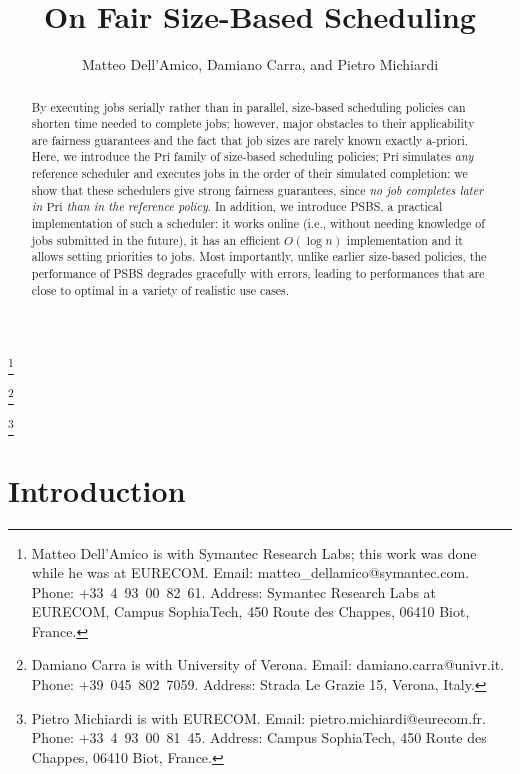 \documentclass[11pt,oneside,english]{amsart}
\numberwithin{equation}{section}
\numberwithin{figure}{section}
\theoremstyle{definition}
\theoremstyle{plain}
\begin{document}
\title{On Fair Size-Based Scheduling}


\author{Matteo Dell'Amico, Damiano Carra, and Pietro Michiardi}

\begin{abstract}
By executing jobs serially rather than in parallel, size-based
scheduling policies can shorten time needed to complete jobs; however,
major obstacles to their applicability are fairness guarantees and the
fact that job sizes are rarely known exactly a-priori. Here, we
introduce the $\mathrm{Pri}$ family of size-based scheduling policies;
$\mathrm{Pri}$ simulates \emph{any} reference scheduler and executes
jobs in the order of their simulated completion: we show that these
schedulers give strong fairness guarantees, since \emph{no job
  completes later in $\mathrm{Pri}$ than in the reference policy}. In
addition, we introduce PSBS, a practical implementation of such a
scheduler: it works online (i.e., without needing knowledge of jobs submitted
in the future), it has an efficient $O(\log n)$ implementation and it
allows setting priorities to jobs. Most importantly, unlike earlier
size-based policies, the performance of PSBS degrades gracefully with
errors, leading to performances that are close to optimal in a variety
of realistic use cases.
\end{abstract}


\thanks{Matteo Dell'Amico is with Symantec Research Labs; this work
  was done while he was at EURECOM. Email:
  matteo\_dellamico@symantec.com. Phone: +33~4~93~00~82~61. Address:
  Symantec Research Labs at EURECOM, Campus SophiaTech, 450 Route des
  Chappes, 06410 Biot, France.}

\thanks{Damiano Carra is with University of Verona.  Email:
  damiano.carra@univr.it. Phone: +39~045~802~7059. Address: Strada Le
  Grazie 15, Verona, Italy.}

\thanks{Pietro Michiardi is with EURECOM. Email:
  pietro.michiardi@eurecom.fr. Phone: +33~4~93~00~81~45. Address:
  Campus SophiaTech, 450 Route des Chappes, 06410 Biot, France.}

\maketitle

\newpage

\section{Introduction}
\end{document}
